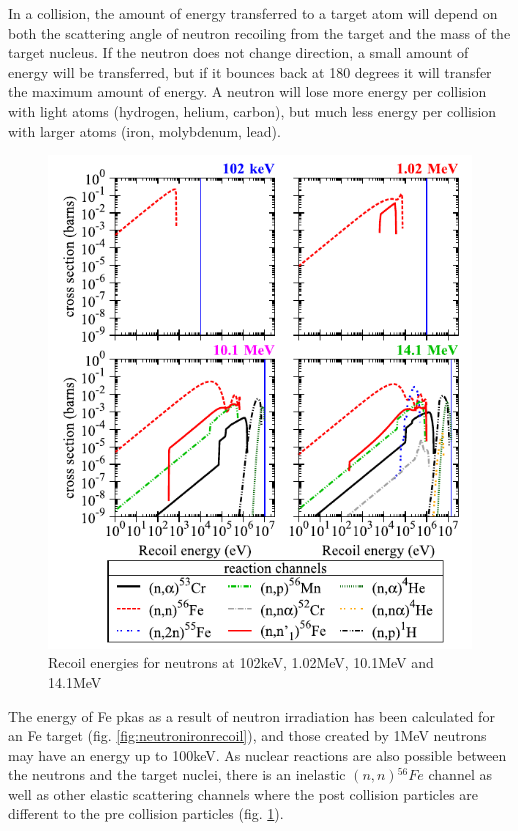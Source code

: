 In a collision, the amount of energy transferred to a target atom will depend on both the scattering angle of neutron recoiling from the target and the mass of the target nucleus.  If the neutron does not change direction, a small amount of energy will be transferred, but if it bounces back at 180 degrees it will transfer the maximum amount of energy.  A neutron will lose more energy per collision with light atoms (hydrogen, helium, carbon), but much less energy per collision with larger atoms (iron, molybdenum, lead).

\begin{figure}[h]
  \begin{center}
    \includegraphics[width=.65\linewidth]{chapters/austenitic_steels_in_nuclear/images/neutronrecoils.png}
    \caption{Recoil energies for neutrons at 102keV, 1.02MeV, 10.1MeV and 14.1MeV\cite{pkaenergyspectra}}
    \label{fig:ferecoilchannels}
  \end{center}
\end{figure}
\FloatBarrier


The energy of Fe \acrshort{pka}s as a result of neutron irradiation has been calculated for an Fe target\cite{pkaenergyspectra} (fig. \ref{fig:neutronironrecoil}), and those created by 1MeV neutrons may have an energy up to 100keV.  As nuclear reactions are also possible between the neutrons and the target nuclei, there is an inelastic $(n,n) {}^{56}Fe$ channel as well as other elastic scattering channels where the post collision particles are different to the pre collision particles (fig. \ref{fig:ferecoilchannels}).






